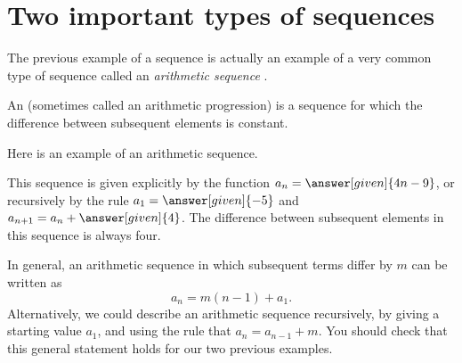 \documentclass{ximera}
\begin{document}
  
  
  










\section{Two important types of sequences}

The previous example of a sequence is actually an example of a very common type of sequence called an \emph{arithmetic sequence} .  

\begin{definition}
  An  (sometimes called an arithmetic
  progression) is a sequence for which the
  difference between subsequent elements is constant.
\end{definition}


\begin{example}
  Here is an example of an arithmetic sequence.
  \begin{image}
  \end{image}
  This sequence is given explicitly by the function $a_n=\answer[given]{4n-9}$,
  or recursively by the rule $a_1 = \answer[given]{-5}$ and $a_{n+1} = a_n
  + \answer[given]{4}$. The difference between subsequent elements in this sequence is always four.
\end{example}

In general, an arithmetic sequence in which subsequent terms differ
by $m$ can be written as
\[
a_n = m (n-1) + a_1.
\]
Alternatively, we could describe an arithmetic sequence recursively,
by giving a starting value $a_1$, and using the rule that $a_{n} =
a_{n-1} + m$.  You should check that this general statement holds for our 
two previous examples.
\end{document}
